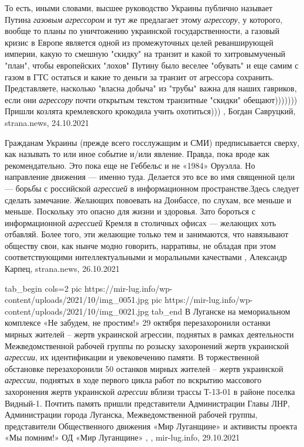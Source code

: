 То есть, иными словами, высшее руководство Украины публично называет Путина
\emph{газовым агрессором} и тут же предлагает этому \emph{агрессору}, у которого, вообще то
планы по уничтожению украинской государственности, а газовый кризис в Европе
является одной из промежуточных целей реванширующей империи, какую то смешную
"скидку" на транзит и какой то хитровымученый "план", чтобы европейских "лохов"
Путину было веселее "обувать" и еще самим с газом в ГТС остаться и какие то
деньги за транзит от агрессора сохранить.  Представляете, насколько "власна
добыча" из "трубы" важна для наших гавриков, если они \emph{агрессору} почти открытым
текстом транзитные "скидки" обещают))))))) Пришли козлята кремлевского
крокодила учить охотиться)))
, 
Богдан Савруцкий, strana.news, 24.10.2021

Гражданам Украины (прежде всего госслужащим и СМИ) предписывается сверху, как
называть то или иное событие и/или явление. Правда, пока вроде как
рекомендательно. Это пока еще не Геббельс и не «1984» Оруэлла. Но направление
движения — именно туда.  Делается это все во имя священной цели — борьбы с
российской \emph{агрессией} в информационном пространстве.Здесь следует сделать
замечание. Желающих повоевать на Донбассе, по слухам, все меньше и меньше.
Поскольку это опасно для жизни и здоровья. Зато бороться с информационной
\emph{агрессией} Кремля в столичных офисах — желающих хоть отбавляй. Более
того, эти желающие только тем и занимаются, что навязывают обществу свои, как
нынче модно говорить, нарративы, не обладая при этом соответствующими
интеллектуальными и моральными качествами
, 
Александр Карпец, strana.news, 26.10.2021

\ifcmt
  tab_begin cols=2
     pic https://mir-lug.info/wp-content/uploads/2021/10/img_0051.jpg
     pic https://mir-lug.info/wp-content/uploads/2021/10/img_0021.jpg
  tab_end
\fi
В Луганске на мемориальном комплексе «Не забудем, не простим!» 29 октября
перезахоронили останки мирных жителей – жертв украинской агрессии, поднятых в
рамках деятельности Межведомственной рабочей группы по розыску захоронений
жертв украинской \emph{агрессии}, их идентификации и увековечению памяти.  В
торжественной обстановке перезахоронили 50 останков мирных жителей – жертв
украинской \emph{агрессии}, поднятых в ходе первого цикла работ по вскрытию массового
захоронения жертв украинской \emph{агрессии} вблизи трассы Т-13-01 в районе поселка
Видный-1. Почтить память пришли представители Администрации Главы ЛНР,
Администрации города Луганска, Межведомственной рабочей группы, представители
Общественного движения «Мир Луганщине» и активисты проекта «Мы помним!» ОД «Мир
Луганщине»
, 
, mir-lug.info, 29.10.2021

